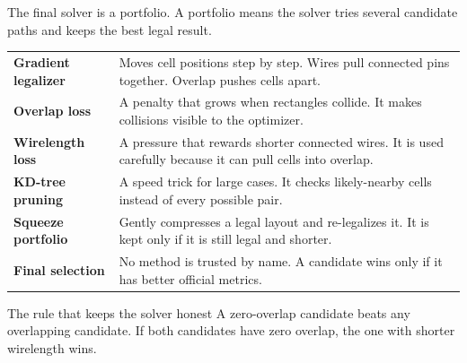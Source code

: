 \documentclass[11pt]{article}
\begin{document}
The final solver is a portfolio. A portfolio means the solver tries several candidate paths and keeps the best legal result.

\begin{center}
\end{center}

\begin{tabularx}{\textwidth}{>{\bfseries\color{navy}}p{}X}
Gradient legalizer & Moves cell positions step by step. Wires pull connected pins together. Overlap pushes cells apart. \\
Overlap loss & A penalty that grows when rectangles collide. It makes collisions visible to the optimizer. \\
Wirelength loss & A pressure that rewards shorter connected wires. It is used carefully because it can pull cells into overlap. \\
KD-tree pruning & A speed trick for large cases. It checks likely-nearby cells instead of every possible pair. \\
Squeeze portfolio & Gently compresses a legal layout and re-legalizes it. It is kept only if it is still legal and shorter. \\
Final selection & No method is trusted by name. A candidate wins only if it has better official metrics. \\
\end{tabularx}

\begin{plainbox}{The rule that keeps the solver honest}
A zero-overlap candidate beats any overlapping candidate. If both candidates have zero overlap, the one with shorter wirelength wins.
\end{plainbox}
\end{document}
